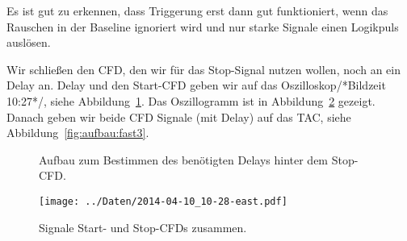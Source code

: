 Es ist gut zu erkennen, dass Triggerung erst dann gut funktioniert, wenn das
Rauschen in der Baseline ignoriert wird und nur starke Signale einen Logikpuls
auslösen.

Wir schließen den CFD, den wir für das Stop-Signal nutzen wollen, noch an ein
Delay an. Delay und den Start-CFD geben wir auf das Oszilloskop/*Bildzeit
10:27*/, siehe Abbildung~\ref{fig:aufbau:fast2}. Das Oszillogramm ist in
Abbildung~\ref{fig:cfd_stop} gezeigt. Danach geben wir beide CFD Signale
(mit Delay) auf das TAC, siehe Abbildung~\ref{fig:aufbau:fast3}.

\begin{figure}[htbp]
    \centering
    \caption{%
        Aufbau zum Bestimmen des benötigten Delays hinter dem Stop-CFD.
    }
    \label{fig:aufbau:fast2}
\end{figure}

\begin{figure}[htbp]
    \centering
    \texttt{[image: ../Daten/2014-04-10\_10-28-east.pdf]}
    \caption{%
        Signale Start- und Stop-CFDs zusammen.
    }
    \label{fig:cfd_stop}
\end{figure}

